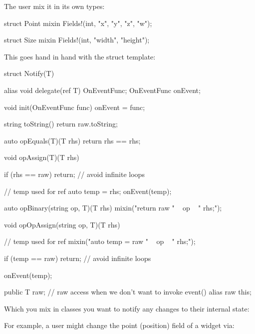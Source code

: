 The user mix it in its own types:

\begin{dcode}
struct Point {
    mixin Fields!(int, "x", "y", "z", "w");
}

struct Size {
    mixin Fields!(int, "width", "height");
}
\end{dcode}

This goes hand in hand with the  struct template:

\begin{dcode}
struct Notify(T)
{
    alias void delegate(ref T) OnEventFunc;
    OnEventFunc onEvent;

    void init(OnEventFunc func) {
        onEvent = func;
    }

    string toString()
    {
        return raw.toString;
    }

    auto opEquals(T)(T rhs)
    {
        return rhs == rhs;
    }

    void opAssign(T)(T rhs)
    {
        if (rhs == raw)
            return;  // avoid infinite loops
        
        // temp used for ref
        auto temp = rhs;  
        onEvent(temp);
    }

    auto opBinary(string op, T)(T rhs)
    {
        mixin("return raw " ~ op ~ " rhs;");
    }

    void opOpAssign(string op, T)(T rhs)
    {
        // temp used for ref
        mixin("auto temp = raw " ~ op ~ " rhs;");  

        if (temp == raw)
            return;  // avoid infinite loops

        onEvent(temp);
    }

    public T raw;  // raw access when we don't want to invoke event()
    alias raw this;
}
\end{dcode}

Which you mix in classes you want to notify any changes to their internal state:


For example, a user might change the point (position) field of a widget via: 

\begin{dcode}
Point moveBy = Point(10, 0); widget.point += moveBy;}. 
\end{dcode}


